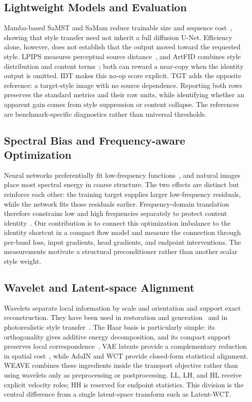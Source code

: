 \documentclass[letterpaper]{article}
\begin{document}
\subsection{Lightweight Models and Evaluation}
\label{sec:rw-light}
Mamba-based SaMST and SaMam reduce trainable size and sequence cost~\cite{liu2024samst,liu2024samam,gu2023mamba},
showing that style transfer need not inherit a full diffusion U-Net. Efficiency alone,
however, does not establish that the output moved toward the requested style. LPIPS
measures perceptual source distance~\cite{zhang2018unreasonable}, and ArtFID combines style
distribution and content terms~\cite{wright2022artfid}; both can reward a near-copy when the
identity output is omitted.
IDT makes this no-op score explicit. TGT adds the opposite reference: a target-style image
with no source dependence. Reporting both rows preserves the standard metrics and their raw
units, while identifying whether an apparent gain comes from style suppression or content
collapse. The references are benchmark-specific diagnostics rather than universal thresholds.

\subsection{Spectral Bias and Frequency-aware Optimization}
\label{sec:rw-spectral}
Neural networks preferentially fit low-frequency functions~\cite{rahaman2019spectral,xu2022frequency},
and natural images place most spectral energy in coarse structure. The two effects are
distinct but reinforce each other: the training target supplies larger low-frequency
residuals, while the network fits those residuals earlier. Frequency-domain translation
therefore constrains low and high frequencies separately to protect content identity~\cite{cai2021fdit}.
Our contribution is to connect this optimization imbalance to the identity shortcut in a
compact flow model and measure the connection through per-band loss, input gradients, head
gradients, and endpoint interventions. The measurements motivate a structural preconditioner
rather than another scalar style weight.

\subsection{Wavelet and Latent-space Alignment}
\label{sec:rw-wavelet}
Wavelets separate local information by scale and orientation and support exact
reconstruction. They have been used in restoration and generation~\cite{phung2023wavelet}
and in photorealistic style transfer~\cite{yoo2019photorealistic}. The Haar basis is
particularly simple: its orthogonality gives additive energy decomposition, and its compact
support preserves local correspondence~\cite{daubechies1992ten}. VAE latents provide a
complementary reduction in spatial cost~\cite{rombach2022high}, while AdaIN and WCT provide
closed-form statistical alignment.
WEAVE combines these ingredients inside the transport objective rather than using wavelets
only as preprocessing or postprocessing. LL, LH, and HL receive explicit velocity roles;
HH is reserved for endpoint statistics. This division is the central difference from a
single latent-space transform such as Latent-WCT.
\end{document}
